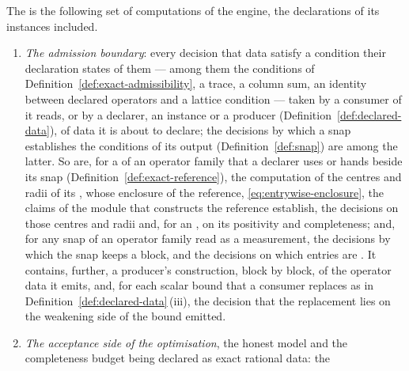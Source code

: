 \begin{definition}\label{def:exact-island}
The  is
the following set of computations of the engine,
the declarations of its instances included.
\begin{enumerate}[label=(\roman*),leftmargin=2.4em]
\item \emph{The admission boundary}: every decision that data satisfy a
  condition their declaration states of them --- among them the conditions of
  Definition~\ref{def:exact-admissibility}, a trace, a column sum, an identity
  between declared operators and a lattice condition --- taken by a consumer
  of  it reads, or by a declarer, an instance or a producer
  (Definition~\ref{def:declared-data}), of data it is about to declare; the
  decisions by which a snap establishes the conditions of its output
  (Definition~\ref{def:snap}) are among the latter. So are, for a
   of an operator family that a declarer uses or hands beside
  its snap (Definition~\ref{def:exact-reference}), the computation of the
  centres and radii of its ,
  whose enclosure of the reference, \eqref{eq:entrywise-enclosure}, the claims
  of the module that constructs the reference establish, the decisions on
  those centres and radii and, for an , on its
  positivity and completeness; and, for any snap of an operator family read
  as a measurement, the decisions by which the snap keeps a block, and the
  decisions on which entries are . It
  contains, further, a
  producer's construction, block by block, of the operator data it emits, and,
  for each scalar bound that a consumer replaces as in
  Definition~\ref{def:declared-data}\,(iii), the decision that the
  replacement lies on the weakening side of the bound emitted.
\item \emph{The acceptance side of the optimisation}, the honest model and
  the completeness budget being declared as exact rational data: the

\end{enumerate}
\end{definition}
